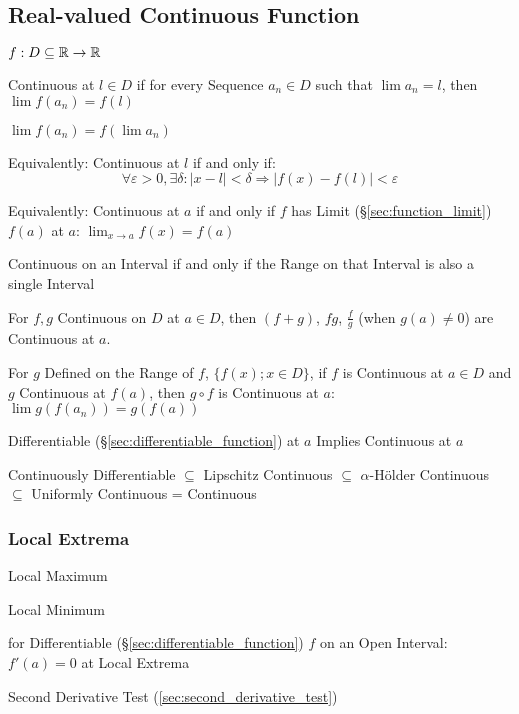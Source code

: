 \subsection{Real-valued Continuous Function}\label{sec:real_continuous}

$f : D \subseteq \mathbb{R} \rightarrow \mathbb{R}$

Continuous at $l \in D$ if for every Sequence $a_n \in D$ such that
$\lim a_n = l$, then $\lim f(a_n) = f(l)$

$\lim f (a_n) = f (\lim a_n)$

Equivalently: Continuous at $l$ if and only if:
\[
  \forall \varepsilon > 0, \exists \delta :
  |x - l| < \delta \Rightarrow |f(x) - f(l)| < \varepsilon
\]

Equivalently: Continuous at $a$ if and only if $f$ has Limit
(\S\ref{sec:function_limit}) $f(a)$ at $a$: $\lim_{x \rightarrow
  a}f(x) = f(a)$

Continuous on an Interval if and only if the Range on that Interval is
also a single Interval

For $f,g$ Continuous on $D$ at $a \in D$, then $(f + g)$, $f g$,
$\frac{f}{g}$ (when $g(a) \neq 0$) are Continuous at $a$.

For $g$ Defined on the Range of $f$, $\{ f(x); x \in D\}$, if $f$ is
Continuous at $a \in D$ and $g$ Continuous at $f(a)$, then $g \circ f$
is Continuous at $a$: $\lim g(f(a_n)) = g(f(a))$

Differentiable (\S\ref{sec:differentiable_function}) at $a$ Implies
Continuous at $a$

Continuously Differentiable $\subseteq$ Lipschitz Continuous $\subseteq$
$\alpha$-H\"older Continuous $\subseteq$ Uniformly Continuous = Continuous



\subsubsection{Local Extrema}\label{sec:local_extrema}

Local Maximum

Local Minimum

for Differentiable (\S\ref{sec:differentiable_function}) $f$ on an
Open Interval: $f'(a) = 0$ at Local Extrema

\fist Second Derivative Test (\ref{sec:second_derivative_test})




